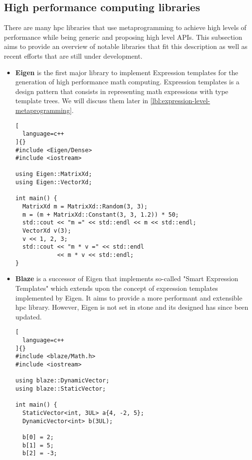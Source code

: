 \documentclass[../main]{subfiles}
\begin{document}
\subsection{High performance computing libraries}

There are many \cpp \gls{hpc} libraries that use metaprogramming to achieve
high levels of performance while being generic and proposing high level APIs.
This subsection aims to provide an overview of notable libraries that fit this
description as well as recent efforts that are still under development.

\begin{itemize}

\item
\textbf{Eigen} \cite{eigen} is the first major \cpp library to implement
Expression templates for the generation of high performance math computing.
Expression templates is a \cpp design pattern that consists in representing
math expressions with type template trees. We will discuss them later
in \ref{lbl:expression-level-metaprogramming}.

\begin{lstlisting}[
  language=c++
]{}
#include <Eigen/Dense>
#include <iostream>

using Eigen::MatrixXd;
using Eigen::VectorXd;

int main() {
  MatrixXd m = MatrixXd::Random(3, 3);
  m = (m + MatrixXd::Constant(3, 3, 1.2)) * 50;
  std::cout << "m =" << std::endl << m << std::endl;
  VectorXd v(3);
  v << 1, 2, 3;
  std::cout << "m * v =" << std::endl
            << m * v << std::endl;
}
\end{lstlisting}

\item
\textbf{Blaze} \cite{blazelib} is a successor of Eigen that implements so-called
"Smart Expression Templates" which extends upon the concept of
expression templates implemented by Eigen. It aims to provide a more performant
and extensible \gls{hpc} library. However, Eigen is not set in stone
and its designed has since been updated.

\begin{lstlisting}[
  language=c++
]{}
#include <blaze/Math.h>
#include <iostream>

using blaze::DynamicVector;
using blaze::StaticVector;

int main() {
  StaticVector<int, 3UL> a{4, -2, 5};
  DynamicVector<int> b(3UL);

  b[0] = 2;
  b[1] = 5;
  b[2] = -3;


\end{lstlisting}
\end{itemize}
\end{document}
